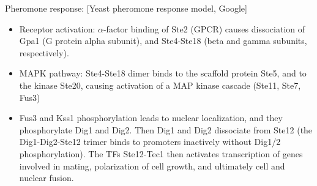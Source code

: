 \documentclass{report}
\begin{document}
Pheromone response: [Yeast pheromone response model, Google]
\begin{itemize}
	\item Receptor activation: $\alpha$-factor binding of Ste2 (GPCR) causes dissociation of Gpa1 (G protein alpha subunit), and Ste4-Ste18 (beta and gamma subunits, respectively). 
	\item MAPK pathway: Ste4-Ste18 dimer binds to the scaffold protein Ste5, and to the kinase Ste20, causing activation of a MAP kinase cascade (Ste11, Ste7, Fus3)
	\item Fus3 and Kss1 phosphorylation leads to nuclear localization, and they phosphorylate Dig1 and Dig2. Then Dig1 and Dig2 dissociate from Ste12 (the Dig1-Dig2-Ste12 trimer binds to promoters inactively without Dig1/2 phosphorylation). The TFs Ste12-Tec1 then activates transcription of genes involved in mating, polarization of cell growth, and ultimately cell and nuclear fusion. 
\end{itemize}
\end{document}
